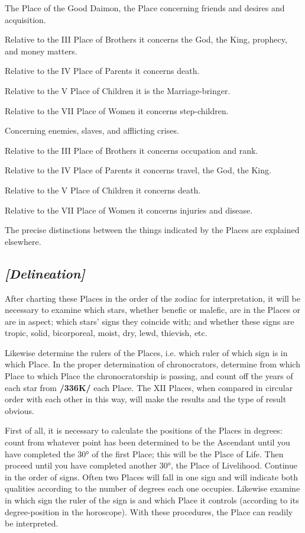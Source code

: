 \begin{description}[labelindent=0em , labelwidth=1em, labelsep=1em, leftmargin =!]
\item[XI.] 
	The Place of the Good Daimon, the Place concerning friends and desires and acquisition. 
	
	Relative to the III Place of Brothers it concerns the God, the King, prophecy, and money matters. 
	
	Relative to the IV Place of Parents it concerns death. 
	
	Relative to the V Place of Children it is the Marriage-bringer. 
	
	Relative to the VII Place of Women it concerns step-children.
	
\item[XII.]
	 Concerning enemies, slaves, and afflicting crises. 
	 
	 Relative to the III Place of Brothers it concerns occupation and rank. 
	 
	 Relative to the IV Place of Parents it concerns travel, the God, the King. 
	 
	 Relative to the V Place of Children it concerns death. 
	 
	 Relative to the VII Place of Women it concerns injuries and disease.
\end{description}


The precise distinctions between the things indicated by the Places are explained elsewhere. 

\subsection{\textit{[Delineation]}}
After charting these Places in the order of the zodiac for interpretation, it will be necessary to examine which stars, whether benefic or malefic, are in the Places or are in aspect; which stars’ signs they coincide with; and whether these signs are tropic, solid, bicorporeal, moist, dry, lewd, thievish, etc. 

Likewise determine the rulers of the Places, i.e. which ruler of which sign is in which Place. In the proper determination of chronocrators, determine from which Place to which Place the chronocratorship is passing, and count off the years of each star from \textbf{/336K/} each Place. The XII Places, when compared in circular order with each other in this way, will make the results and the type of result obvious.

First  of all, it is necessary to calculate the positions of the Places in degrees: count from whatever point has been determined to be the Ascendant until you have completed the 30° of the first Place; this will be the Place of Life. Then proceed until you have completed another 30°, the Place of Livelihood. Continue in the order of signs. Often two Places will fall in one sign and will indicate both qualities according to
the number of degrees each one occupies. Likewise examine in which sign the ruler of the sign is and which Place it controls (according to its degree-position in the horoscope). With these procedures, the
Place can readily be interpreted. 

